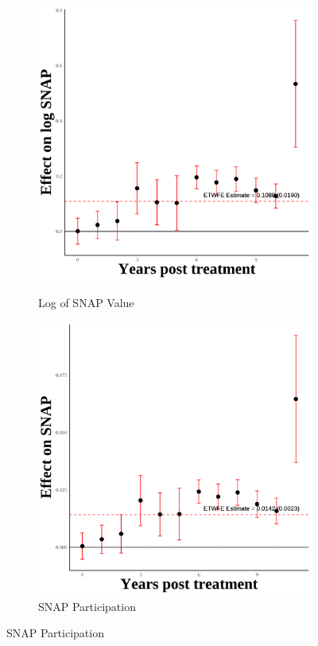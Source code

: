\documentclass[12pt,english]{article}
\begin{document}
\begin{figure}[H]
  \vspace{0.3cm} %

  \begin{subfigure}[b]{0.3\textwidth}
    \centering
    \caption{Log of SNAP Value}
    \includegraphics[width=\linewidth]{figures/plot04-ln_snap_event_study.png}
    \label{fig:ln-snap}
  \end{subfigure}
  \hfill
  \begin{subfigure}[b]{0.3\textwidth}
    \centering
    \caption{SNAP Participation}
    \includegraphics[width=\linewidth]{figures/plot05-snap_event_study.png}

\end{subfigure}
\end{figure}
\end{document}
